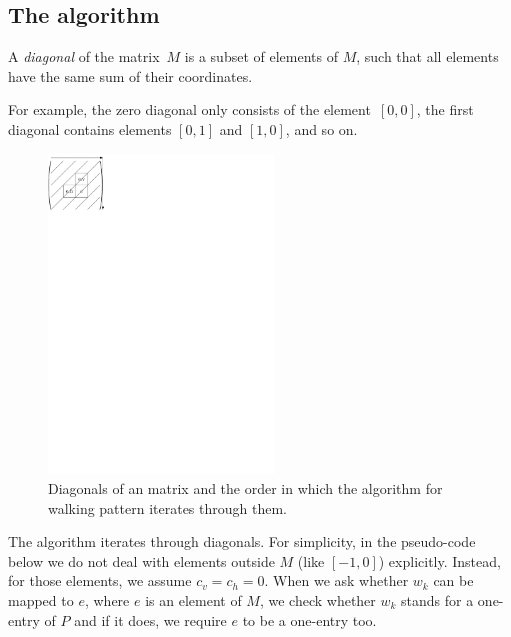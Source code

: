 \subsection{The algorithm}
\begin{defn}
A \emph{diagonal} of the matrix~$M$ is a subset of elements of $M$, such that all elements have the same sum of their coordinates.
\end{defn}
For example, the zero diagonal only consists of the element~$[0,0]$, the first diagonal contains elements $[0,1]$ and $[1,0]$, and so on.
\begin{figure}[h!]
\centering
\includegraphics[width=60mm]{../img/walking_alg.pdf}
\caption{Diagonals of an matrix and the order in which the algorithm for walking pattern iterates through them.}
\end{figure}

The algorithm iterates through diagonals. For simplicity, in the pseudo-code below we do not deal with elements outside $M$ (like $[-1,0]$) explicitly. Instead, for those elements, we assume $c_v=c_h=0$. When we ask whether $w_k$ can be mapped to $e$, where $e$ is an element of $M$, we check whether $w_k$ stands for a one-entry of $P$ and if it does, we require $e$ to be a one-entry too.


